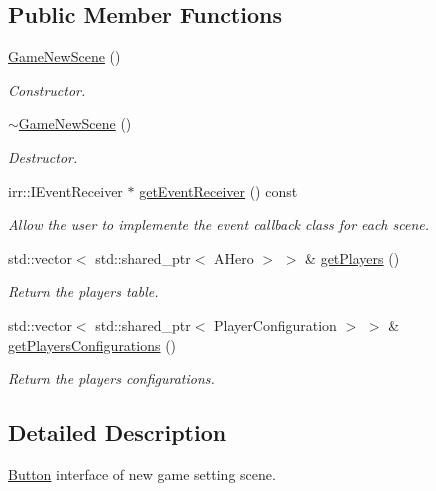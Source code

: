 \subsection*{Public Member Functions}
\begin{DoxyCompactItemize}
\item 
\hyperlink{classGameNewScene_af482b13a2d9e315ef39a6e41293bf4fb}{Game\+New\+Scene} ()
\begin{DoxyCompactList}\small\item\em Constructor. \end{DoxyCompactList}\item 
\hyperlink{classGameNewScene_a3df0ff81012d3f7dbd08c7367be22fdf}{$\sim$\+Game\+New\+Scene} ()
\begin{DoxyCompactList}\small\item\em Destructor. \end{DoxyCompactList}\item 
irr\+::\+I\+Event\+Receiver $\ast$ \hyperlink{classGameNewScene_a21c27ef3ea1923d975683e1bcdd134fa}{get\+Event\+Receiver} () const
\begin{DoxyCompactList}\small\item\em Allow the user to implemente the event callback class for each scene. \end{DoxyCompactList}\item 
\mbox{\label{classGameNewScene_a2fb7cacfacbf5c565c3e2f98bd06aec4}} 
std\+::vector$<$ std\+::shared\+\_\+ptr$<$ A\+Hero $>$ $>$ \& \hyperlink{classGameNewScene_a2fb7cacfacbf5c565c3e2f98bd06aec4}{get\+Players} ()
\begin{DoxyCompactList}\small\item\em Return the players table. \end{DoxyCompactList}\item 
\mbox{\label{classGameNewScene_a8ec7d1675e6be7490aee15126d8f2026}} 
std\+::vector$<$ std\+::shared\+\_\+ptr$<$ Player\+Configuration $>$ $>$ \& \hyperlink{classGameNewScene_a8ec7d1675e6be7490aee15126d8f2026}{get\+Players\+Configurations} ()
\begin{DoxyCompactList}\small\item\em Return the players configurations. \end{DoxyCompactList}\end{DoxyCompactItemize}


\subsection{Detailed Description}
\hyperlink{classButton}{Button} interface of new game setting scene. 


